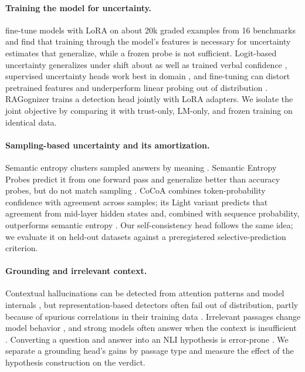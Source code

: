\documentclass[10pt]{article}
\begin{document}
\paragraph{Training the model for uncertainty.} \citet{kapoor2024large} fine-tune models with LoRA on about 20k graded examples from 16 benchmarks and find that training through the model's features is necessary for uncertainty estimates that generalize, while a frozen probe is not sufficient. Logit-based uncertainty generalizes under shift about as well as trained verbal confidence \citep{lin2022teaching}, supervised uncertainty heads work best in domain \citep{shelmanov2025head}, and fine-tuning can distort pretrained features and underperform linear probing out of distribution \citep{kumar2022finetuning}. RAGognizer \citep{ridder2026ragognizer} trains a detection head jointly with LoRA adapters. We isolate the joint objective by comparing it with trust-only, LM-only, and frozen training on identical data.

\paragraph{Sampling-based uncertainty and its amortization.} Semantic entropy clusters sampled answers by meaning \citep{kuhn2023semantic,farquhar2024detecting}. Semantic Entropy Probes predict it from one forward pass and generalize better than accuracy probes, but do not match sampling \citep{kossen2024semantic}. CoCoA combines token-probability confidence with agreement across samples; its Light variant predicts that agreement from mid-layer hidden states and, combined with sequence probability, outperforms semantic entropy \citep{vashurin2025cocoa}. Our self-consistency head follows the same idea; we evaluate it on held-out datasets against a preregistered selective-prediction criterion.

\paragraph{Grounding and irrelevant context.} Contextual hallucinations can be detected from attention patterns \citep{chuang2024lookback} and model internals \citep{sun2025redeep}, but representation-based detectors often fail out of distribution, partly because of spurious correlations in their training data \citep{dubanowska2025representation}. Irrelevant passages change model behavior \citep{cuconasu2024power,yoran2024robust}, and strong models often answer when the context is insufficient \citep{joren2025sufficient}. Converting a question and answer into an NLI hypothesis is error-prone \citep{demszky2018qa2d,chen-etal-2021-nli}. We separate a grounding head's gains by passage type and measure the effect of the hypothesis construction on the verdict.
\end{document}

